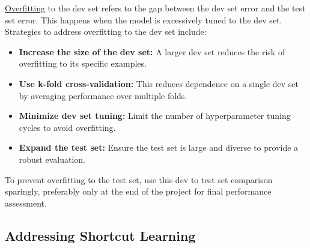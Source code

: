 \documentclass[12pt,openany]{book}
\begin{document}
\hyperref[subsec:overfitting]{Overfitting} to the dev set refers to the gap between the dev set error and the test set error. This happens when the model is excessively tuned to the dev set. Strategies to address overfitting to the dev set include:
\begin{itemize}
    \item \textbf{Increase the size of the dev set:} A larger dev set reduces the risk of overfitting to its specific examples.
    \item \textbf{Use k-fold cross-validation:} This reduces dependence on a single dev set by averaging performance over multiple folds.
    \item \textbf{Minimize dev set tuning:} Limit the number of hyperparameter tuning cycles to avoid overfitting.
    \item \textbf{Expand the test set:} Ensure the test set is large and diverse to provide a robust evaluation.
\end{itemize}

\begin{notebox}
To prevent overfitting to the test set, use this dev to test set comparison sparingly, preferably only at the end of the project for final performance assessment.
\end{notebox}

\subsection{Addressing Shortcut Learning}
\end{document}
